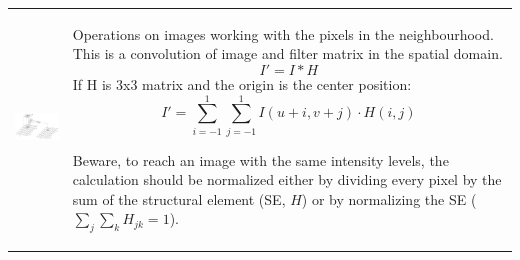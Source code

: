 
\begin{tabular}{ll}
\parbox{7.5cm}{
  \includegraphics[width=7cm]{./images/filter_matrix.png}}
& \parbox{10cm}{
  Operations on images working with the pixels in the neighbourhood. This is a convolution of image 
  and filter matrix in the spatial domain.
  $$I' = I \ast H$$
  If H is 3x3 matrix and the origin is the center position:
  $$I' = \sum_{i=-1}^{1} \sum_{j=-1}^{1} I(u+i, v+j) \cdot H(i,j)$$
  
  Beware, to reach an image with the same intensity levels, the calculation should be 
  normalized either by dividing every pixel by the sum of the structural element (SE, $H$) or
  by normalizing the SE ($\sum_j \sum_k H_{jk} = 1$). 
}
\end{tabular}

